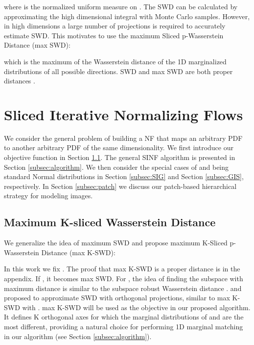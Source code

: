 \documentclass{article}
\begin{document}
where  is the normalized uniform measure on . The SWD can be calculated by approximating the high dimensional integral with Monte Carlo samples. However, in high dimensions a large number of projections is required to accurately estimate SWD. This motivates to use the maximum Sliced p-Wasserstein Distance (max SWD):

which is the maximum of the Wasserstein distance of the 1D marginalized distributions of all possible directions. SWD and max SWD are both proper distances \citep{kolouri2015radon, kolouri2019generalized}.

\section{Sliced Iterative Normalizing Flows}
\label{sec:SINF}

We consider the general problem of building a NF that maps an arbitrary PDF  to another arbitrary PDF  of the same dimensionality. We first introduce our objective function in Section \ref{subsec:max-K-SWD}. The general SINF algorithm is presented in Section \ref{subsec:algorithm}. We then consider the special cases of  and  being standard Normal distributions in Section \ref{subsec:SIG} and Section \ref{subsec:GIS}, respectively. In Section \ref{subsec:patch} we discuss our patch-based hierarchical strategy for modeling images.

\subsection{Maximum K-sliced Wasserstein Distance}

\label{subsec:max-K-SWD}

We generalize the idea of maximum SWD and propose maximum K-Sliced p-Wasserstein Distance (max K-SWD):

In this work we fix . The proof that max K-SWD is a proper distance is in the appendix.
If , it becomes max SWD. For , the idea of finding the subspace with maximum distance is similar to the subspace robust Wasserstein distance \citep{paty2019subspace}. \citet{wu2019sliced} and \citet{rowland2019orthogonal} proposed to approximate SWD with orthogonal projections, similar to max K-SWD with . max K-SWD will be used as the objective in our proposed algorithm. It defines K orthogonal axes  for which the marginal distributions of  and  are the most different, providing a natural choice for performing 1D marginal matching in our algorithm (see Section \ref{subsec:algorithm}).
\end{document}
